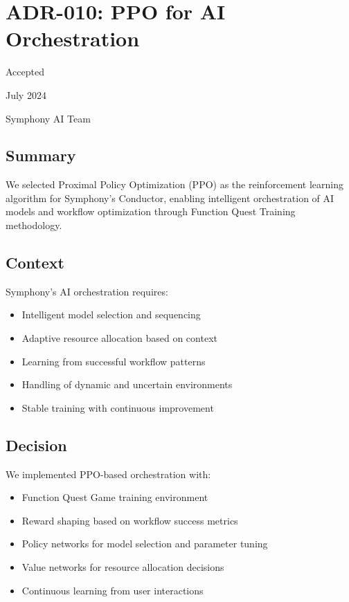 \section*{ADR-010: PPO for AI Orchestration}

\begin{description}[leftmargin=3cm,labelwidth=2.5cm]
\item[\textbf{Status}] Accepted
\item[\textbf{Date}] July 2024
\item[\textbf{Authors}] Symphony AI Team
\end{description}

\subsection*{Summary}

We selected Proximal Policy Optimization (PPO) as the reinforcement learning algorithm for Symphony's Conductor, enabling intelligent orchestration of AI models and workflow optimization through Function Quest Training methodology.

\subsection*{Context}

Symphony's AI orchestration requires:
\begin{itemize}
\item Intelligent model selection and sequencing
\item Adaptive resource allocation based on context
\item Learning from successful workflow patterns
\item Handling of dynamic and uncertain environments
\item Stable training with continuous improvement
\end{itemize}

\subsection*{Decision}

We implemented PPO-based orchestration with:
\begin{itemize}
\item Function Quest Game training environment
\item Reward shaping based on workflow success metrics
\item Policy networks for model selection and parameter tuning
\item Value networks for resource allocation decisions
\item Continuous learning from user interactions
\end{itemize}

